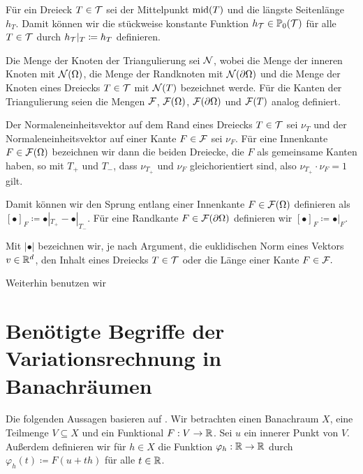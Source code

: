 Für ein Dreieck $T\in\mathcal{T}$ sei
der Mittelpunkt $\textup{mid}(T)$ und die längste Seitenlänge $h_T$.
Damit können wir die stückweise konstante Funktion $h_{\mathcal{T}}\in\mathbb{P}_0(\mathcal{T})$
für alle $T\in\mathcal{T}$ durch $h_{\mathcal{T}}|_T\coloneqq h_T$ definieren.

Die Menge der Knoten der Triangulierung sei $\mathcal{N}$, wobei die Menge
der inneren Knoten mit $\mathcal{N}(\Omega)$, die Menge der Randknoten mit
$\mathcal{N}(\partial\Omega)$ und die Menge der Knoten eines
Dreiecks $T\in\mathcal{T}$ mit $\mathcal{N}(T)$ bezeichnet werde. 
Für die Kanten der Triangulierung seien die Mengen $\mathcal{F}$, $\mathcal{F}(\Omega)$,
$\mathcal{F}(\partial\Omega)$ und $\mathcal{F}(T)$ analog definiert. 

Der Normaleneinheitsvektor auf dem Rand eines Dreiecks $T\in\mathcal{T}$ sei
$\nu_T$ und der Normaleneinheitsvektor auf einer Kante $F\in\mathcal{F}$ sei
$\nu_F$. Für eine Innenkante $F\in\mathcal{F}(\Omega)$ bezeichnen wir dann
die beiden Dreiecke, die $F$ als gemeinsame Kanten haben, so
mit $T_+$ und $T_-$, dass $\nu_{T_+}$ und $\nu_F$ gleichorientiert sind, 
also $\nu_{T_+}\cdot\nu_F=1$ gilt.

Damit können wir den Sprung entlang einer Innenkante $F\in\mathcal{F}(\Omega)$
definieren als $[\bullet]_F\coloneqq \bullet|_{T_+} -\bullet|_{T_-}$.
Für eine Randkante $F\in\mathcal{F}(\partial\Omega)$ definieren wir
$[\bullet]_F\coloneqq \bullet|_F$.

Mit $|\bullet|$ bezeichnen wir, je nach Argument, die euklidischen Norm eines
Vektors $v\in\mathbb{R}^d$, den Inhalt eines Dreiecks $T\in\mathcal{T}$ oder die Länge
einer Kante $F\in\mathcal{F}.$


Weiterhin benutzen wir

\section{Benötigte Begriffe der Variationsrechnung in Banachräumen}

Die folgenden Aussagen basieren auf \cite[S. 189-192]{Zei85}.
Wir betrachten einen Banachraum $X$, eine Teilmenge $V\subseteq X$ und ein
Funktional $F:V\to\mathbb{R}$. Sei $u$ ein innerer Punkt von $V$. Außerdem
definieren wir für $h\in X$ die Funktion $\varphi_h:\mathbb{R}\to\mathbb{R}$ durch 
$\varphi_h(t)\coloneqq F(u+th)$ für alle $t\in\mathbb{R}$.


